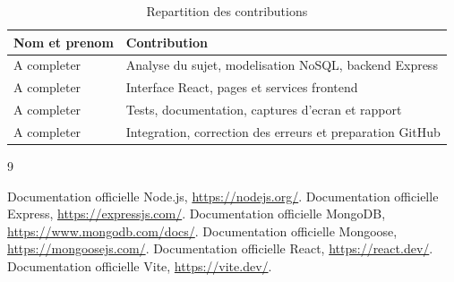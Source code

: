 \documentclass[12pt,a4paper]{report}
\begin{document}
\begin{table}[H]
  \centering
  \caption{Repartition des contributions}
  \begin{tabular}{p{5cm}p{8cm}}
    \toprule
    \textbf{Nom et prenom} & \textbf{Contribution}\\
    \midrule
    A completer & Analyse du sujet, modelisation NoSQL, backend Express\\
    A completer & Interface React, pages et services frontend\\
    A completer & Tests, documentation, captures d'ecran et rapport\\
    A completer & Integration, correction des erreurs et preparation GitHub\\
    \bottomrule
  \end{tabular}
\end{table}

\begin{thebibliography}{9}
 Documentation officielle Node.js, \url{https://nodejs.org/}.
 Documentation officielle Express, \url{https://expressjs.com/}.
 Documentation officielle MongoDB, \url{https://www.mongodb.com/docs/}.
 Documentation officielle Mongoose, \url{https://mongoosejs.com/}.
 Documentation officielle React, \url{https://react.dev/}.
 Documentation officielle Vite, \url{https://vite.dev/}.
\end{thebibliography}
\end{document}
